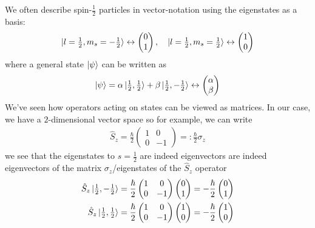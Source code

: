We often describe spin-$\tfrac{1}{2}$ particles in vector-notation using the eigenstates as a basis:
\begin{align*}
  \ket{l = \tfrac{1}{2}, m_s = -\tfrac{1}{2}} \leftrightarrow \begin{pmatrix}
  0 \\ 1
  \end{pmatrix}, \quad
  \ket{l = \tfrac{1}{2}, m_s = \tfrac{1}{2}} \leftrightarrow \begin{pmatrix}
  1 \\ 0
  \end{pmatrix} 
\end{align*}
where a general state $\ket{\psi}$ can be written as
\begin{align*}
  \ket{\psi} = \alpha \ket{\tfrac{1}{2}, \tfrac{1}{2}} + \beta \ket{\tfrac{1}{2}, -\tfrac{1}{2}} \leftrightarrow \begin{pmatrix}
  \alpha \\ \beta
  \end{pmatrix}
\end{align*}
We've seen how operators acting on states can be viewed as matrices. 
In our case, we have a $2$-dimensional vector space so for example, we can write 
\begin{align*}
  \hat{S}_z = \frac{\hbar}{2} \begin{pmatrix}
  1 & 0\\
  0 & -1
  \end{pmatrix} =: \frac{\hbar}{2} \sigma_z
\end{align*}
we see that the eigenstates to $s = \tfrac{1}{2}$ are indeed eigenvectors are indeed eigenvectors of the matrix $\sigma_z$/eigenstates of the $\hat{S}_z$ operator
\begin{align*}
 \hat{S}_z \ket{\tfrac{1}{2}, -\tfrac{1}{2}} = \frac{\hbar}{2} \begin{pmatrix}
 1 & 0\\
 0 & -1
 \end{pmatrix}
 \begin{pmatrix}
 0 \\ 1
 \end{pmatrix}
 = - \frac{\hbar}{2} \begin{pmatrix}
 0 \\ 1
 \end{pmatrix}\\
 \hat{S}_z \ket{\tfrac{1}{2}, \tfrac{1}{2}} = \frac{\hbar}{2} \begin{pmatrix}
 1 & 0\\
 0 & -1
 \end{pmatrix}
 \begin{pmatrix}
 1 \\ 0
 \end{pmatrix}
 = - \frac{\hbar}{2} \begin{pmatrix}
 1 \\ 0
 \end{pmatrix}
\end{align*}

